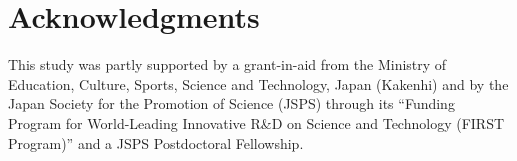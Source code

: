 \documentclass[twocolumn,superscriptaddress]{revtex4}
\begin{document}
\section*{Acknowledgments}
This study was partly supported by a grant-in-aid from 
the Ministry of Education, Culture, Sports, Science and Technology, Japan (Kakenhi)
and by the Japan Society for the Promotion of
Science (JSPS) through its ``Funding Program for World-Leading
Innovative R\&D on Science and Technology (FIRST Program)'' and a JSPS Postdoctoral Fellowship.






\end{document}
